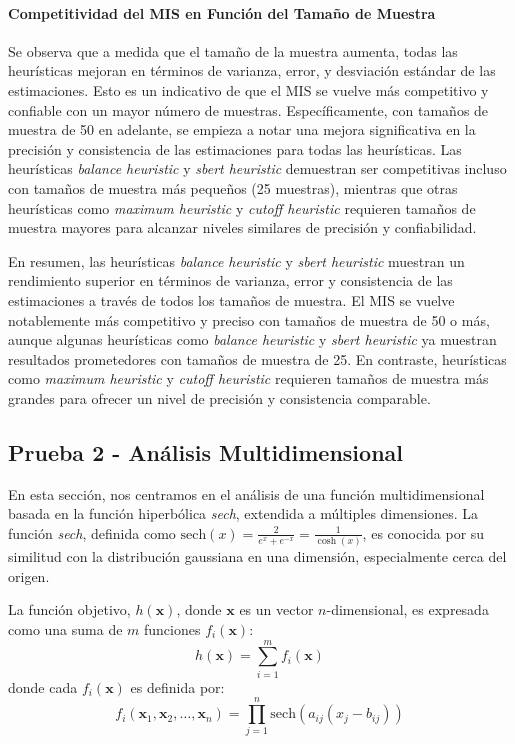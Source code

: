 \documentclass{article}
\begin{document}
\paragraph{Competitividad del MIS en Función del Tamaño de Muestra}
Se observa que a medida que el tamaño de la muestra aumenta, todas las heurísticas mejoran en términos de varianza, error, y desviación estándar de las estimaciones. Esto es un indicativo de que el MIS se vuelve más competitivo y confiable con un mayor número de muestras.
Específicamente, con tamaños de muestra de 50 en adelante, se empieza a notar una mejora significativa en la precisión y consistencia de las estimaciones para todas las heurísticas.
Las heurísticas \textit{balance heuristic} y \textit{sbert heuristic} demuestran ser competitivas incluso con tamaños de muestra más pequeños (25 muestras), mientras que otras heurísticas como \textit{maximum heuristic} y \textit{cutoff heuristic} requieren tamaños de muestra mayores para alcanzar niveles similares de precisión y confiabilidad.

En resumen, las heurísticas \textit{balance heuristic} y \textit{sbert heuristic} muestran un rendimiento superior en términos de varianza, error y consistencia de las estimaciones a través de todos los tamaños de muestra. El MIS se vuelve notablemente más competitivo y preciso con tamaños de muestra de 50 o más, aunque algunas heurísticas como \textit{balance heuristic} y \textit{sbert heuristic} ya muestran resultados prometedores con tamaños de muestra de 25. En contraste, heurísticas como \textit{maximum heuristic} y \textit{cutoff heuristic} requieren tamaños de muestra más grandes para ofrecer un nivel de precisión y consistencia comparable.

\subsection{Prueba 2 - Análisis Multidimensional}

En esta sección, nos centramos en el análisis de una función multidimensional basada en la función hiperbólica \textit{sech}, extendida a múltiples dimensiones. La función \textit{sech}, definida como \( \text{sech}(x) = \frac{2}{e^x + e^{-x}} = \frac{1}{\cosh(x)} \), es conocida por su similitud con la distribución gaussiana en una dimensión, especialmente cerca del origen.

La función objetivo, \( h(\mathbf{x}) \), donde \( \mathbf{x} \) es un vector \( n \)-dimensional, es expresada como una suma de \( m \) funciones \( f_i(\mathbf{x}) \):
\[ h(\mathbf{x}) = \sum_{i=1}^{m} f_i(\mathbf{x}) \]
donde cada \( f_i(\mathbf{x}) \) es definida por:
\[ f_i(\mathbf{x}_1, \mathbf{x}_2, \ldots, \mathbf{x}_n) = \prod_{j=1}^{n} \text{sech}(a_{ij} (x_j - b_{ij})) \]
\end{document}
